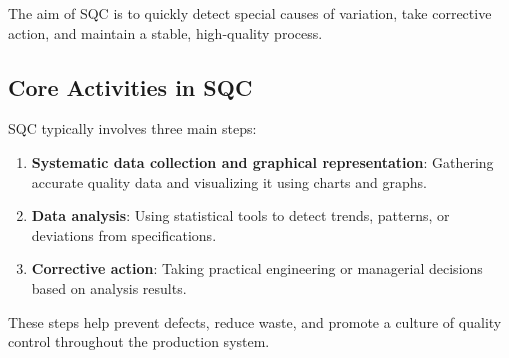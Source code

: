 \documentclass[twoside]{book}
\begin{document}
The aim of SQC is to quickly detect special causes of variation, take corrective action, and maintain a stable, high-quality process.

\subsection{Core Activities in SQC}

SQC typically involves three main steps:
\begin{enumerate}
    \item \textbf{Systematic data collection and graphical representation}: Gathering accurate quality data and visualizing it using charts and graphs.
    \item \textbf{Data analysis}: Using statistical tools to detect trends, patterns, or deviations from specifications.
    \item \textbf{Corrective action}: Taking practical engineering or managerial decisions based on analysis results.
\end{enumerate}

These steps help prevent defects, reduce waste, and promote a culture of quality control throughout the production system.

%
%
%
%
%
\end{document}
